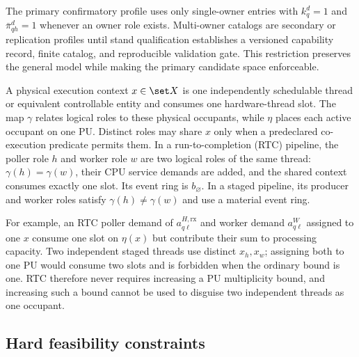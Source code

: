 The primary confirmatory profile uses only single-owner entries with $k_q^d=1$ and $\bar\pi^d_{qh}=1$ whenever an owner role exists. Multi-owner catalogs are secondary or replication profiles until stand qualification establishes a versioned capability record, finite catalog, and reproducible validation gate. This restriction preserves the general model while making the primary candidate space enforceable.

A physical execution context $x\in\set X$ is one independently schedulable thread or equivalent controllable entity and consumes one hardware-thread slot. The map $\gamma$ relates logical roles to these physical occupants, while $\eta$ places each active occupant on one PU. Distinct roles may share $x$ only when a predeclared co-execution predicate permits them. In a run-to-completion (RTC) pipeline, the poller role $h$ and worker role $w$ are two logical roles of the same thread: $\gamma(h)=\gamma(w)$, their CPU service demands are added, and the shared context consumes exactly one slot. Its event ring is $b_\varnothing$. In a staged pipeline, its producer and worker roles satisfy $\gamma(h)\neq\gamma(w)$ and use a material event ring.

For example, an RTC poller demand of $a^{H,\mathrm{rx}}_{q\ell}$ and worker demand $a^W_{q\ell}$ assigned to one $x$ consume one slot on $\eta(x)$ but contribute their sum to processing capacity. Two independent staged threads use distinct $x_h,x_w$; assigning both to one PU would consume two slots and is forbidden when the ordinary bound is one. RTC therefore never requires increasing a PU multiplicity bound, and increasing such a bound cannot be used to disguise two independent threads as one occupant.

\subsection{Hard feasibility constraints}

